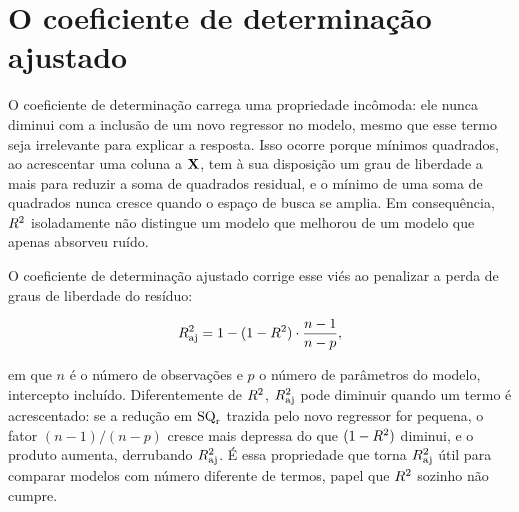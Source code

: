 \documentclass{doeapostila}
\begin{document}
\section{O coeficiente de determinação ajustado}
\label{sec:r2-ajustado}

O coeficiente de determinação carrega uma propriedade incômoda: ele nunca
diminui com a inclusão de um novo regressor no modelo, mesmo que esse termo
seja irrelevante para explicar a resposta. Isso ocorre porque mínimos
quadrados, ao acrescentar uma coluna a $\mathbf{X}$, tem à sua disposição um
grau de liberdade a mais para reduzir a soma de quadrados residual, e o
mínimo de uma soma de quadrados nunca cresce quando o espaço de busca se
amplia. Em consequência, $R^{2}$ isoladamente não distingue um modelo que
melhorou de um modelo que apenas absorveu ruído.

O coeficiente de determinação ajustado corrige esse viés ao penalizar a
perda de graus de liberdade do resíduo:

\begin{equation}
  R^{2}_{\mathrm{aj}} = 1 - (1 - R^{2}) \cdot \frac{n-1}{n-p} ,
  \label{eq:r2-ajustado}
\end{equation}

em que $n$ é o número de observações e $p$ o número de parâmetros do
modelo, intercepto incluído. Diferentemente de $R^{2}$, $R^{2}_{\mathrm{aj}}$ pode
diminuir quando um termo é acrescentado: se a redução em $\mathrm{SQ}_{\mathrm{r}}$ trazida
pelo novo regressor for pequena, o fator $(n-1)/(n-p)$ cresce mais depressa
do que $(1-R^{2})$ diminui, e o produto aumenta, derrubando $R^{2}_{\mathrm{aj}}$. É
essa propriedade que torna $R^{2}_{\mathrm{aj}}$ útil para comparar modelos com número
diferente de termos, papel que $R^{2}$ sozinho não cumpre.
\end{document}
